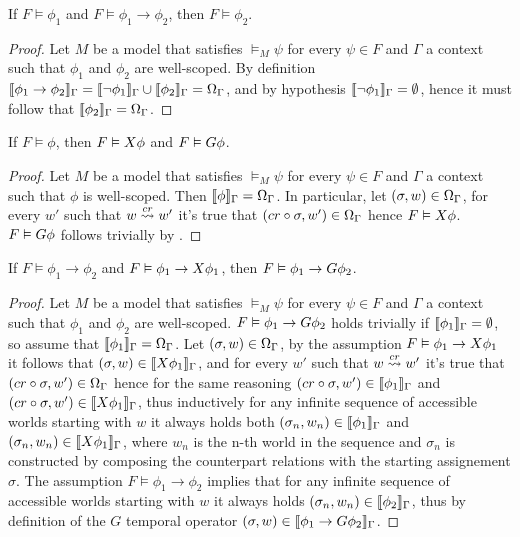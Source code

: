 \begin{lemma}\label{lem:mp}
  If $F \vDash \phi_1$ and $F \vDash \phi_1 \to \phi_2$, then $F \vDash \phi_2$.
\end{lemma}
\begin{proof}
  Let $M$ be a model that satisfies $\vDash_M \psi$ for every $\psi \in F$ and $\Gamma$ a context such that $\phi_1$ and
  $\phi_2$ are well-scoped. By definition $\llbracket \phi_1 \to \phi_2 \rrbracket_{\Gamma} = \llbracket \neg\phi_1 \rrbracket_{\Gamma} \cup
  \llbracket \phi_2 \rrbracket_{\Gamma} = \Omega_{\Gamma}$, and by hypothesis $\llbracket \neg\phi_1 \rrbracket_{\Gamma} = \emptyset$, hence it must
  follow that $\llbracket \phi_2 \rrbracket_{\Gamma} = \Omega_{\Gamma}$.
\end{proof}
\begin{lemma}\label{lem:nex}
  If $F \vDash \phi$, then $F \vDash X{\phi}$ and $F \vDash G{\phi}$.
\end{lemma}
\begin{proof}
  Let $M$ be a model that satisfies $\vDash_M \psi$ for every $\psi \in F$ and $\Gamma$ a context such that $\phi$ is
  well-scoped. Then $\llbracket \phi \rrbracket_{\Gamma} = \Omega_{\Gamma}$. In particular, let $(\sigma, w) \in \Omega_{\Gamma}$,
  for every $w'$ such that $w \overset{cr}{\rightsquigarrow} w'$ it's true that $(cr \circ \sigma, w') \in \Omega_{\Gamma}$ hence $F
  \vDash X{\phi}$. $F \vDash G{\phi}$ follows trivially by .
\end{proof}
\begin{lemma}\label{lem:ind}
  If $F \vDash \phi_1 \to \phi_2$ and $F \vDash \phi_1 \to X{\phi_1}$, then $F \vDash \phi_1 \to G{\phi_2}$.
\end{lemma}
\begin{proof}
  Let $M$ be a model that satisfies $\vDash_M \psi$ for every $\psi \in F$ and $\Gamma$ a context such that $\phi_1$ and
  $\phi_2$ are well-scoped. $F \vDash \phi_1 \to G{\phi_2}$ holds trivially if $\llbracket \phi_1 \rrbracket_{\Gamma} =
  \emptyset$, so assume that $\llbracket \phi_1 \rrbracket_{\Gamma} = \Omega_{\Gamma}$.
  Let $(\sigma, w) \in \Omega_{\Gamma}$, by the assumption $F \vDash \phi_1 \to X{\phi_1}$ it follows that
  $(\sigma, w) \in \llbracket X{\phi_1} \rrbracket_{\Gamma}$, and for every $w'$ such that $w \overset{cr}{\rightsquigarrow} w'$ it's true that $(cr
  \circ \sigma, w') \in \Omega_{\Gamma}$ hence for the same reasoning $(cr \circ \sigma, w') \in \llbracket \phi_1 \rrbracket_{\Gamma}$
  and $(cr \circ \sigma, w') \in \llbracket X{\phi_1} \rrbracket_{\Gamma}$, thus inductively for any infinite sequence of accessible
  worlds starting with $w$ it always holds both $(\sigma_n, w_n) \in \llbracket \phi_1 \rrbracket_{\Gamma}$ and $(\sigma_n, w_n) \in
  \llbracket X{\phi_1} \rrbracket_{\Gamma}$, where $w_n$ is the n-th world in the sequence and $\sigma_n$ is constructed by composing
  the counterpart relations with the starting assignement $\sigma$.
  The assumption $F \vDash \phi_1 \to \phi_2$ implies that for any infinite sequence of accessible worlds starting with
  $w$ it always holds $(\sigma_n, w_n) \in \llbracket \phi_2 \rrbracket_{\Gamma}$, thus by definition of the $G$ temporal operator
  $(\sigma, w) \in \llbracket \phi_1 \to G{\phi_2} \rrbracket_{\Gamma}$.
\end{proof}
